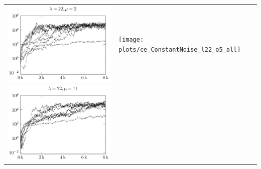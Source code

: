 \begin{tabular}{@{}l@{}l@{}}
\includegraphics[scale=1]{plots/ce_ConstantNoise_l22_o2_all}&
\texttt{[image: plots/ce\_ConstantNoise\_l22\_o5\_all]}\\
\includegraphics[scale=1]{plots/ce_ConstantNoise_l22_o11_all}
\end{tabular}

